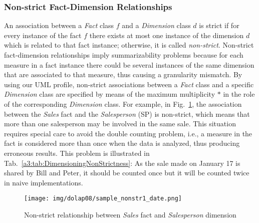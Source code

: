 \subsubsection{Non-strict Fact-Dimension Relationships}
An association between a \emph{Fact} class $f$ and a
\emph{Dimension} class $d$ is strict if for every instance of the
fact $f$ there exists at most one instance of the dimension $d$
which is related to that fact instance; otherwise, it is called
\emph{non-strict}. Non-strict fact-dimension relationships imply
summarizability problems because for each measure in a fact instance
there could be several instances of the same dimension that are
associated to that measure, thus causing a granularity mismatch. By
using our UML profile, non-strict associations between a \emph{Fact}
class and a specific \emph{Dimension} class are specified by means
of the maximum multiplicity $*$ in the role of the corresponding
\emph{Dimension} class. For example, in
Fig.~\ref{a3:sample_nonstrict1}, the association between the
\emph{Sales} fact and the \emph{Salesperson} (SP) is non-strict,
which means that more than one salesperson may be involved in the
same sale. This situation requires special care to avoid the double
counting problem, i.e., a measure in the fact is considered more
than once when the data is analyzed, thus producing erroneous
results. This problem is illustrated in
Tab.~\ref{a3:tab:DimensioningNonStrictness}: As the sale made on
January 17 is shared by Bill and Peter, it should be counted once
but it will be counted twice in naive implementations.

\begin{figure}
\begin{center}
\texttt{[image: img/dolap08/sample\_nonstr1\_date.png]}
\end{center}
\caption{Non-strict relationship between \emph{Sales} fact and
\emph{Salesperson} dimension} \label{a3:sample_nonstrict1}
\end{figure}


